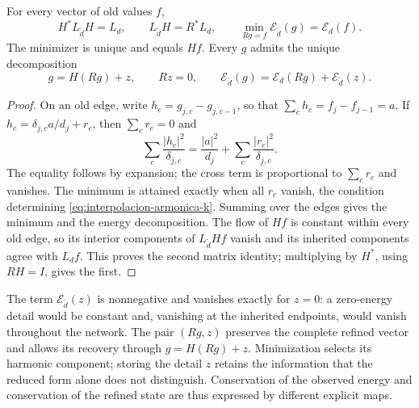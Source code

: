 \begin{theorem}
\label{thm:energia-schur-refinamiento}
For every vector of old values \(f\),
\begin{equation}
 H^*L_{\widetilde d}H=L_d,
 \qquad L_{\widetilde d}H=R^*L_d,
 \qquad
 \min_{Rg=f}\mathcal E_{\widetilde d}(g)=\mathcal E_d(f).
 \label{eq:isometria-energia-k}
\end{equation}
The minimizer is unique and equals \(Hf\). Every \(g\) admits
the unique decomposition
\begin{equation}
 g=H(Rg)+z,\qquad Rz=0,
 \qquad
 \mathcal E_{\widetilde d}(g)
 =\mathcal E_d(Rg)+\mathcal E_{\widetilde d}(z).
 \label{eq:detalle-energia-k}
\end{equation}
\end{theorem}
\begin{proof}
On an old edge, write \(h_c=g_{j,c}-g_{j,c-1}\), so that
\(\sum_ch_c=f_j-f_{j-1}=a\). If
\(h_c=\delta_{j,c}a/d_j+r_c\), then \(\sum_cr_c=0\) and
\[
 \sum_c\frac{|h_c|^2}{\delta_{j,c}}
 =\frac{|a|^2}{d_j}+\sum_c\frac{|r_c|^2}{\delta_{j,c}}.
\]
The equality follows by expansion; the cross term is proportional to
\(\sum_cr_c\) and vanishes. The minimum is attained exactly when
all \(r_c\) vanish, the condition determining
\eqref{eq:interpolacion-armonica-k}. Summing over the edges gives
the minimum and the energy decomposition. The flow of \(Hf\) is
constant within every old edge, so its interior components of
\(L_{\widetilde d}Hf\) vanish and its inherited components agree
with \(L_df\). This proves the second matrix identity; multiplying
by \(H^*\), using \(RH=I\), gives the first.
\end{proof}

The term \(\mathcal E_{\widetilde d}(z)\) is nonnegative and
vanishes exactly for \(z=0\): a zero-energy detail would be constant
and, vanishing at the inherited endpoints, would vanish throughout
the network. The pair \((Rg,z)\) preserves the complete refined
vector and allows its recovery through \(g=H(Rg)+z\).
Minimization selects its harmonic component; storing the detail \(z\)
retains the information that the reduced form alone does not distinguish.
Conservation of the observed energy and conservation of the refined
state are thus expressed by different explicit maps.

